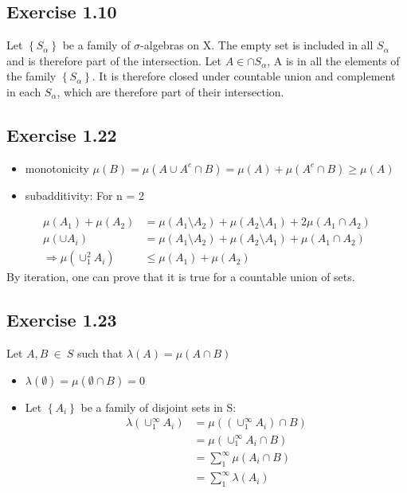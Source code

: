 \documentclass[11pt]{article}
\numberwithin{equation}{section}
\theoremstyle{plain}
\theoremstyle{definition}
\newcommand\parens[1]{\left( #1 \right)}
\newcommand\braces[1]{\left\{ #1 \right\}}
\def\imp{\Rightarrow}
\newcommand{\1}{\mathbbm 1}
\def\a{\alpha}
\def\l{\lambda}
\def\s{\sigma}
\begin{document}
\subsection*{Exercise 1.10}

Let $\braces{S_\a}$ be a family of $\s$-algebras on X. The empty set is included in all $S_\a$ and is therefore part of the intersection. 
Let $A \in \cap S_\a$, A is in all the elements of the family $\braces{S_\a}$. It is therefore closed under countable union and complement in each $S_\a$, which are therefore part of their intersection. 

\subsection*{Exercise 1.22}

\begin{itemize}
	\item monotonicity $ \mu (B) = \mu (A \cup A^c\cap B) = \mu (A) + \mu (A^c\cap B) \geq \mu (A) $
	\item subadditivity: For n = 2

\end{itemize}
\begin{align}
\mu (A_1) + \mu (A_2) &= \mu(A_1 \setminus A_2) + \mu(A_2 \setminus A_1) + 2 \mu(A_1 \cap A_2) \\
\mu \parens{\cup A_i} &= \mu(A_1 \setminus A_2) + \mu(A_2 \setminus A_1) + \mu(A_1 \cap A_2) \\
\imp \mu \parens{\cup^2_1 A_i} &\leq \mu (A_1) + \mu (A_2)
\end{align}
By iteration, one can prove that it is true for a countable union of sets.

\subsection*{Exercise 1.23}

Let $A,B \ \in \ S $ such that $\l (A) = \mu(A\cap B)$
\begin{itemize}
	\item $\l (\emptyset) = \mu( \emptyset \cap B) = 0 $
	\item Let $\braces{A_i}$ be a family of disjoint sets in S: 
	\begin{align*}
	\l (\cup^\infty_1 A_i) &= \mu( \parens{\cup^\infty_1 A_i} \cap B) \\
						   &= \mu(\cup^\infty_1 A_i \cap B)\\
						   &= \sum^\infty_1 \mu(A_i \cap B) \\
						   &= \sum^\infty_1 \l(A_i)
	\end{align*}
	
\end{itemize}
\end{document}
